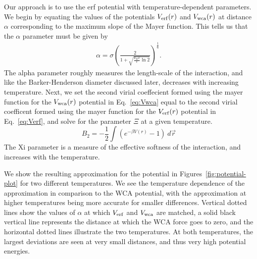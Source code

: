 \documentclass[letterpaper,twocolumn,amsmath,amssymb,prb]{revtex4-1}
\begin{document}
Our approach is to use the erf potential with temperature-dependent parameters. 
We begin by equating the values of the potentials $V_{\mathrm{erf}}(r)$ and $V_{\mathrm{wca}}(r)$ at distance
$\alpha$ corresponding to
the maximum slope of the Mayer function. This tells us that the $\alpha$ parameter must be given by
\begin{align}
  \alpha = \sigma \left( \frac{2}{1 + \sqrt{\frac{k_BT}{\epsilon}
        \ln 2}} \right)^{\frac{1}{6}}.
\end{align}
The alpha parameter roughly measures the length-scale of the
interaction, and like the Barker-Henderson diameter discussed later, decreases with
increasing temperature.  Next, we set the second virial coeffecient formed using 
the mayer function for the $V_{\mathrm{wca}}(r)$ potential in Eq.~\ref{eq:Vwca} equal to the second virial coefficent formed using the mayer function for the $V_{\mathrm{erf}}(r)$ potential in Eq.~\ref{eq:Verf}, and solve for the parameter $\Xi$ at a given temperature.
\begin{equation}B_2=-\frac{1}{2}\int{(e^{-\beta V(r)} - 1)~d{\vec{r}}}\end{equation}
The Xi parameter is a measure of the effective softness of the interaction, and
increases with the temperature.  

We show the resulting approximation
for the potential in Figures~\ref{fig:potential-plot} for two
different temperatures.  We see the temperature dependence of the
approximation in comparison to the WCA potential, with the
approximation at higher temperatures being more accurate for smaller
differences. Vertical dotted lines show the values of $\alpha$ at
which $V_{\mathrm{erf}}$ and $V_{\mathrm{wca}}$ are matched, a solid black vertical line
represents the distance at which the WCA force goes to zero, and the
horizontal dotted lines illustrate the two temperatures.  At both
temperatures, the largest deviations are seen at very small distances,
and thus very high potential energies.
\end{document}
